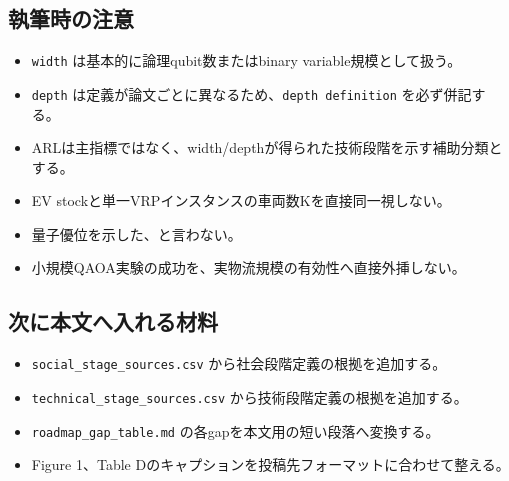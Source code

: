 \subsection*{執筆時の注意}

\begin{itemize}
  \item \texttt{width} は基本的に論理qubit数またはbinary variable規模として扱う。
  \item \texttt{depth} は定義が論文ごとに異なるため、\texttt{depth definition} を必ず併記する。
  \item ARLは主指標ではなく、width/depthが得られた技術段階を示す補助分類とする。
  \item EV stockと単一VRPインスタンスの車両数Kを直接同一視しない。
  \item 量子優位を示した、と言わない。
  \item 小規模QAOA実験の成功を、実物流規模の有効性へ直接外挿しない。
\end{itemize}

\subsection*{次に本文へ入れる材料}

\begin{itemize}
  \item \texttt{social\_stage\_sources.csv} から社会段階定義の根拠を追加する。
  \item \texttt{technical\_stage\_sources.csv} から技術段階定義の根拠を追加する。
  \item \texttt{roadmap\_gap\_table.md} の各gapを本文用の短い段落へ変換する。
  \item Figure 1、Table Dのキャプションを投稿先フォーマットに合わせて整える。
\end{itemize}
